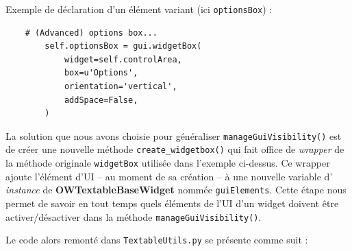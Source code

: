 \documentclass{article}
\begin{document}
Exemple de déclaration d'un élément variant (ici \texttt{optionsBox}) : 

\begin{verbatim}
    # (Advanced) options box...
        self.optionsBox = gui.widgetBox(
            widget=self.controlArea,
            box=u'Options',
            orientation='vertical',
            addSpace=False,
        )
\end{verbatim}

La solution que nous avons choisie pour généraliser \texttt{manageGuiVisibility()} est de créer une nouvelle méthode \texttt{create\_widgetbox()} qui fait office de \textit{wrapper} de la méthode originale \texttt{widgetBox} utilisée dans l'exemple ci-dessus. Ce wrapper ajoute l'élément d'UI – au moment de sa création – à une nouvelle variable d' \textit{instance} de \textbf{OWTextableBaseWidget} nommée \texttt{guiElements}. Cette étape nous permet de savoir en tout temps quels éléments de l'UI d'un widget doivent être activer/désactiver dans la méthode \texttt{manageGuiVisibility()}.

Le code alors remonté dans \texttt{TextableUtils.py} se présente comme suit : 
\end{document}
